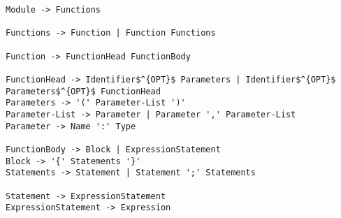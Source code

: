 \documentclass[border=5pt]{standalone}
\begin{document}
\begin{spacing}{2}
\begin{lstlisting}
Module -> Functions

Functions -> Function | Function Functions

Function -> FunctionHead FunctionBody

FunctionHead -> Identifier$^{OPT}$ Parameters | Identifier$^{OPT}$ Parameters$^{OPT}$ FunctionHead
Parameters -> '(' Parameter-List ')'
Parameter-List -> Parameter | Parameter ',' Parameter-List
Parameter -> Name ':' Type

FunctionBody -> Block | ExpressionStatement
Block -> '{' Statements '}'
Statements -> Statement | Statement ';' Statements

Statement -> ExpressionStatement
ExpressionStatement -> Expression
\end{lstlisting}
\end{spacing}
\end{document}
